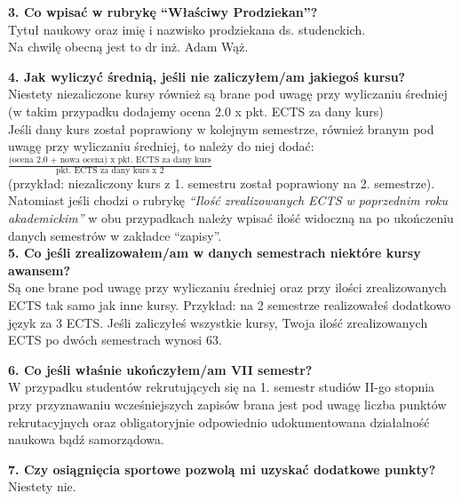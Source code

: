 \documentclass[11pt]{article}
\begin{document}
\textbf{3. Co wpisać w rubrykę “Właściwy Prodziekan”?}\\
Tytuł naukowy oraz imię i nazwisko prodziekana ds. studenckich.\\ Na chwilę obecną jest to dr inż. Adam Wąż. 

\textbf{4. Jak wyliczyć średnią, jeśli nie zaliczyłem/am jakiegoś kursu?}\\
	Niestety niezaliczone kursy również są brane pod uwagę przy wyliczaniu średniej (w takim przypadku dodajemy ocena 2.0 x pkt. ECTS za dany kurs)  \\
	Jeśli dany kurs został poprawiony w kolejnym semestrze, również branym pod uwagę przy wyliczaniu średniej, to należy do niej dodać: $\frac{\mbox{(ocena 2.0 + nowa ocena) x pkt. ECTS za dany kurs}}{\mbox{pkt. ECTS za dany kurs x 2}} $\\(przykład: niezaliczony kurs z 1. semestru został poprawiony na 2. semestrze).\\
	Natomiast jeśli chodzi o rubrykę \textit{“Ilość zrealizowanych ECTS w poprzednim roku akademickim”} w obu przypadkach należy wpisać ilość widoczną na {} po ukończeniu danych semestrów w zakładce “zapisy”. \\
	
\textbf{5. Co jeśli zrealizowałem/am w danych semestrach niektóre kursy awansem? }\\
	Są one brane pod uwagę przy wyliczaniu średniej oraz przy ilości zrealizowanych ECTS tak samo jak inne kursy. Przykład: na 2 semestrze realizowałeś dodatkowo język za 3 ECTS. Jeśli zaliczyłeś wszystkie kursy, Twoja ilość zrealizowanych ECTS po dwóch semestrach wynosi 63. 
	
\textbf{6.  Co jeśli właśnie ukończyłem/am VII semestr? }\\
	W przypadku studentów rekrutujących się na 1. semestr studiów II-go stopnia przy przyznawaniu wcześniejszych zapisów brana jest pod uwagę liczba punktów rekrutacyjnych oraz obligatoryjnie odpowiednio udokumentowana działalność naukowa bądź samorządowa.
	
\textbf{7. Czy osiągnięcia sportowe pozwolą mi uzyskać dodatkowe punkty? }\\
	Niestety nie. 
	
\end{document}
